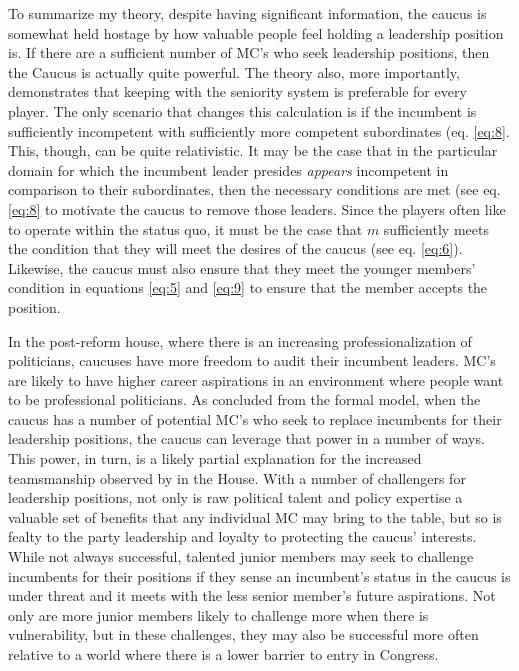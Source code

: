 \documentclass [12pt]{article}
\begin{document}
To summarize my theory, despite having significant information, the caucus is somewhat held hostage by how valuable people feel holding a leadership position is. If there are a sufficient number of MC's who seek leadership positions, then the Caucus is actually quite powerful. The theory also, more importantly, demonstrates that keeping with the seniority system is preferable for every player. The only scenario that changes this calculation is if the incumbent is sufficiently incompetent with sufficiently more competent subordinates (eq. \ref{eq:8}. This, though, can be quite relativistic. It may be the case that in the particular domain for which the incumbent leader presides \textit{appears} incompetent in comparison to their subordinates, then the necessary conditions are met (see eq. \ref{eq:8} to motivate the caucus to remove those leaders. Since the players often like to operate within the status quo, it must be the case that $m$ sufficiently meets the condition that they will meet the desires of the caucus (see eq. \ref{eq:6}). Likewise, the caucus must also ensure that they meet the younger members' condition in equations \ref{eq:5} and \ref{eq:9} to ensure that the member accepts the position. 

In the post-reform house, where there is an increasing professionalization of politicians, caucuses have more freedom to audit their incumbent leaders. MC's are likely to have higher career aspirations in an environment where people want to be professional politicians. As concluded from the formal model, when the caucus has a number of potential MC's who seek to replace incumbents for their leadership positions, the caucus can leverage that power in a number of ways. This power, in turn, is a likely partial explanation for the increased teamsmanship observed by  in the House. With a number of challengers for leadership positions, not only is raw political talent and policy expertise a valuable set of benefits that any individual MC may bring to the table, but so is fealty to the party leadership and loyalty to protecting the caucus' interests. While not always successful, talented junior members may seek to challenge incumbents for their positions if they sense an incumbent's status in the caucus is under threat and it meets with the less senior member's future aspirations. Not only are more junior members likely to challenge more when there is vulnerability, but in these challenges, they may also be successful more often relative to a world where there is a lower barrier to entry in Congress.
\end{document}
